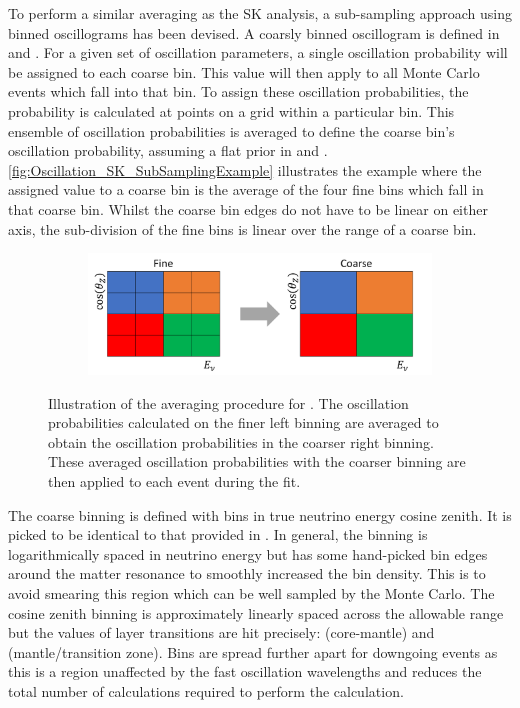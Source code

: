 To perform a similar averaging as the SK analysis, a sub-sampling approach using binned oscillograms has been devised. A coarsly binned oscillogram is defined in  and . For a given set of oscillation parameters, a single oscillation probability will be assigned to each coarse bin. This value will then apply to all Monte Carlo events which fall into that bin. To assign these oscillation probabilities, the probability is calculated at  points on a grid within a particular bin. This ensemble of oscillation probabilities is averaged to define the coarse bin's oscillation probability, assuming a flat prior in  and . \autoref{fig:Oscillation_SK_SubSamplingExample} illustrates the  example where the assigned value to a coarse bin is the average of the four fine bins which fall in that coarse bin. Whilst the coarse bin edges do not have to be linear on either axis, the sub-division of the fine bins is linear over the range of a coarse bin.

\begin{figure}[h]
  \begin{subfigure}[t]{\textwidth}
    \includegraphics[width=\textwidth, trim={0mm 0mm 0mm 0mm}, clip,page=1]{Figures/Oscillation/SubSamplingExample.pdf}
  \end{subfigure}
  \caption{Illustration of the averaging procedure for . The oscillation probabilities calculated on the finer left binning are averaged to obtain the oscillation probabilities in the coarser right binning. These averaged oscillation probabilities with the coarser binning are then applied to each event during the fit.}
  \label{fig:Oscillation_SK_SubSamplingExample}
\end{figure}

The coarse binning is defined with  bins in true neutrino energy \quickmath{\times} cosine zenith. It is picked to be identical to that provided in \cite{t2k_tn_425}. In general, the binning is logarithmically spaced in neutrino energy but has some hand-picked bin edges around the matter resonance to smoothly increased the bin density. This is to avoid smearing this region which can be well sampled by the Monte Carlo. The cosine zenith binning is approximately linearly spaced across the allowable range but the values of layer transitions are hit precisely:  (core-mantle) and  (mantle/transition zone). Bins are spread further apart for downgoing events as this is a region unaffected by the fast oscillation wavelengths and reduces the total number of calculations required to perform the calculation.

